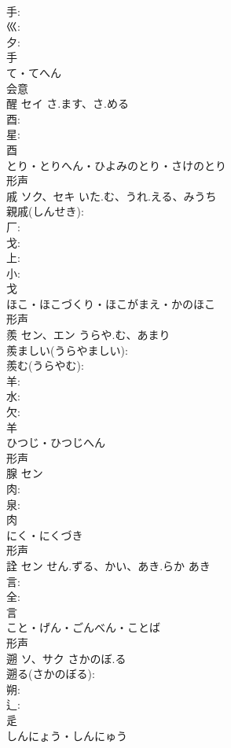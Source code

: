 \documentclass[8pt]{extreport}
\begin{document}
\begin{CJK}{UTF8}{min}
\\	手: 
\\	巛: 
\\	夕: 
\\	手	
\\	て・てへん	
\\	会意 
\\	醒	セイ	さ.ます、さ.める		
\\	酉: 
\\	星: 
\\	酉	
\\	とり・とりへん・ひよみのとり・さけのとり	
\\	形声 
\\	戚	ソク、セキ	いた.む、うれ.える、みうち		
\\	親戚(しんせき): 
\\	厂: 
\\	戈: 
\\	上: 
\\	小: 
\\	戈	
\\	ほこ・ほこづくり・ほこがまえ・かのほこ	
\\	形声 
\\	羨	セン、エン	うらや.む、あまり		
\\	羨ましい(うらやましい): 
\\	羨む(うらやむ): 
\\	羊: 
\\	水: 
\\	欠: 
\\	羊	
\\	ひつじ・ひつじへん	
\\	形声 
\\	腺	セン			
\\	肉: 
\\	泉: 
\\	肉	
\\	にく・にくづき	
\\	形声 
\\	詮	セン	せん.ずる、かい、あき.らか	あき	
\\	言: 
\\	全: 
\\	言	
\\	こと・げん・ごんべん・ことば	
\\	形声 
\\	遡	ソ、サク	さかのぼ.る		
\\	遡る(さかのぼる): 
\\	朔: 
\\	辶: 
\\	辵	
\\	しんにょう・しんにゅう	

\end{CJK}
\end{document}
